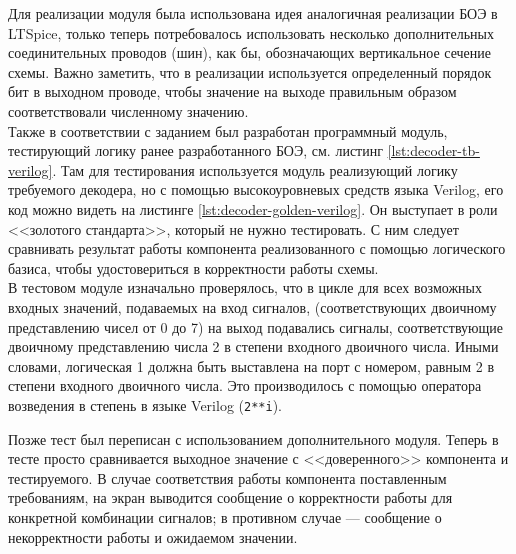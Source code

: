 Для реализации модуля была использована идея аналогичная реализации БОЭ в LTSpice,
только теперь потребовалось использовать несколько дополнительных соединительных 
проводов (шин), как бы, обозначающих вертикальное сечение схемы. Важно заметить,
что в реализации используется определенный порядок бит в выходном проводе, чтобы 
значение на выходе правильным образом соответствовали численному значению.
\\



Также в соответствии с заданием был разработан программный модуль, тестирующий
логику ранее разработанного БОЭ, см. листинг \ref{lst:decoder-tb-verilog}. Там
для тестирования используется модуль реализующий логику требуемого декодера, но
с помощью высокоуровневых средств языка Verilog, его код можно видеть на
листинге \ref{lst:decoder-golden-verilog}. Он выступает в роли <<золотого
стандарта>>, который не нужно тестировать. С ним следует сравнивать результат
работы компонента реализованного с помощью логического базиса, чтобы
удостовериться в корректности работы схемы.
\\
 




В тестовом модуле изначально проверялось, что в цикле для всех возможных входных
значений, подаваемых на вход сигналов, (соответствующих двоичному представлению
чисел от 0 до 7) на выход подавались сигналы, соответствующие двоичному
представлению числа 2 в степени входного двоичного числа. Иными словами,
логическая 1 должна быть выставлена на порт с номером, равным 2 в степени
входного двоичного числа. Это производилось с помощью оператора возведения в
степень в языке Verilog (\verb|2**i|).

Позже тест был переписан с использованием дополнительного модуля. Теперь в тесте
просто сравнивается выходное значение с <<доверенного>> компонента и
тестируемого. В случае соответствия работы компонента поставленным требованиям,
на экран выводится сообщение о корректности работы для конкретной комбинации
сигналов; в противном случае --- сообщение о некорректности работы и ожидаемом
значении.
\\


